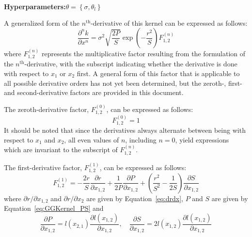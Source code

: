 \documentclass{article}
\begin{document}
\begin{center}
	\textbf{Hyperparameters:}\hspace{20pt}$\theta = \left\lbrace \sigma,\theta_l \right\rbrace$
\end{center}

A generalized form of the $n^{\text{th}}$-derivative of this kernel can be expressed as follows:
\begin{equation}
\label{eq:GGKernel_dnx}
	\frac{\partial^n k}{\partial x^n} = \sigma^2 \sqrt{\frac{2P}{S}} \exp{\left(-\frac{r^2}{S}\right)} F^{\left(n\right)}_{1,2}
\end{equation}
where $F^{\left(n\right)}_{1,2}$ represents the multiplicative factor resulting from the formulation of the $n^{\text{th}}$-derivative, with the subscript indicating whether the derivative is done with respect to $x_1$ or $x_2$ first. A general form of this factor that is applicable to all possible derivative orders has not yet been determined, but the zeroth-, first- and second-derivative factors are provided in this document.

The zeroth-derivative factor, $F^{\left(0\right)}_{1,2}$, can be expressed as follows:
\begin{equation}
\label{eq:GGKernel_F0}
	F^{\left(0\right)}_{1,2} = 1
\end{equation}
It should be noted that since the derivatives always alternate between being with respect to $x_1$ and $x_2$, all even values of $n$, including $n=0$, yield expressions which are invariant to the subscript of $F^{\left(n\right)}_{1,2}$.

The first-derivative factor, $F^{\left(1\right)}_{1,2}$, can be expressed as follows:
\begin{equation}
\label{eq:GGKernel_F1}
	F^{\left(1\right)}_{1,2} = -\frac{2r}{S} \frac{\partial r}{\partial x_{1,2}} + \frac{1}{2P} \frac{\partial P}{\partial x_{1,2}} + \left(\frac{r^2}{S^2} - \frac{1}{2S}\right) \frac{\partial S}{\partial x_{1,2}}
\end{equation}
where $\partial r/\partial x_{1,2}$ and $\partial r/\partial x_2$ are given by Equation~\eqref{eq:drdx}, $P$ and $S$ are given by Equation~\eqref{eq:GGKernel_PS} and
\begin{equation}
\label{eq:GGKernel_d1PS}
	\frac{\partial P}{\partial x_{1,2}} = l\!\left(x_{2,1}\right) \frac{\partial l\!\left(x_{1,2}\right)}{\partial x_{1,2}}, \quad \frac{\partial S}{\partial x_{1,2}} = 2 l\!\left(x_{1,2}\right) \frac{\partial l\!\left(x_{1,2}\right)}{\partial x_{1,2}}
\end{equation}
\end{document}
